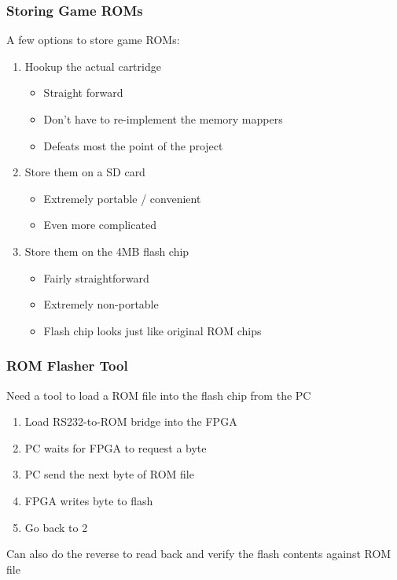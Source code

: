 \documentclass{beamer}
\begin{document}
\begin{frame}
    \frametitle{Storing Game ROMs}

    A few options to store game ROMs:
    \begin{enumerate}
        \item<1->Hookup the actual cartridge
        \begin{itemize}
            \item<4->Straight forward
            \item<5->Don't have to re-implement the memory mappers
            \item<6->Defeats most the point of the project
        \end{itemize}
        \item<2->Store them on a SD card
        \begin{itemize}
            \item<8->Extremely portable / convenient
            \item<9->Even more complicated
        \end{itemize}
        \item<3->Store them on the 4MB flash chip
        \begin{itemize}
            \item<11->Fairly straightforward
            \item<12->Extremely non-portable
            \item<13->Flash chip looks just like original ROM chips
        \end{itemize}
    \end{enumerate}
\end{frame}

\begin{frame}
    \frametitle{ROM Flasher Tool}

    Need a tool to load a ROM file into the flash chip from the PC
    \vspace{0.25cm}
    \begin{enumerate}
        \item<2->Load RS232-to-ROM bridge into the FPGA
        \item<3->PC waits for FPGA to request a byte
        \item<4->PC send the next byte of ROM file
        \item<5->FPGA writes byte to flash
        \item<6->Go back to 2
    \end{enumerate}
    \vspace{0.5cm}
     {Can also do the reverse to read back and verify the flash contents against ROM file}
\end{frame}
\end{document}
